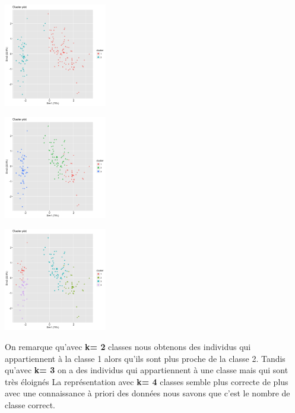 \documentclass[10pt]{article}
\begin{document}
		\begin{minipage}{.5\textwidth}
		\includegraphics[width=45mm]{Figures/Iris_2/kmeans2.png}
		\label{fig:iris_kmeans2}
	\end{minipage}%
	\hspace{0.02\linewidth}
	\begin{minipage}{.5\textwidth}
		\includegraphics[width=45mm]{Figures/Iris_2/kmeans3.png}
		\label{fig:iris_kmens3}
	\end{minipage}
	\vspace{0.1mm}
	\begin{center}
		\includegraphics[width=45mm]{Figures/Iris_2/kmeans4.png}
		\label{fig:iris_kmens4}
	\end{center}

On remarque qu'avec \textbf{k= 2 }classes nous obtenons des individus qui appartiennent à la classe 1 alors qu'ils sont plus proche de la classe 2. Tandis qu'avec \textbf{k= 3} on a des individus qui appartiennent à une classe mais qui sont très éloignés La représentation avec \textbf{k= 4} classes semble plus correcte de plus avec une connaissance à priori des données nous savons que c'est le nombre de classe correct.\\
\end{document}
